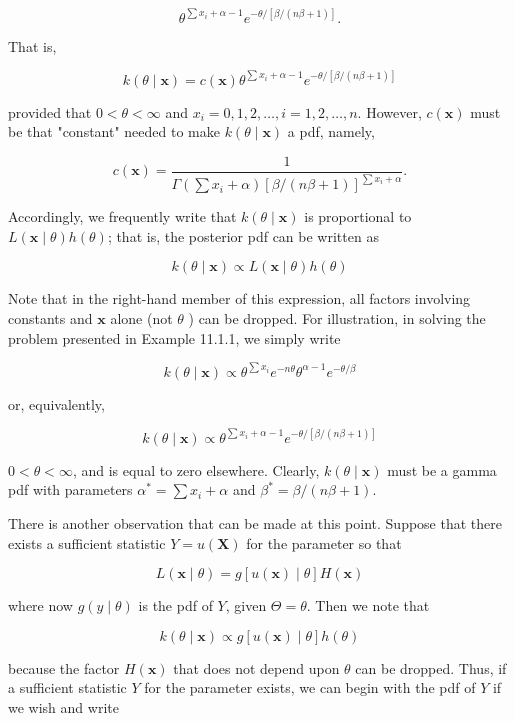 $$
\theta^{\sum x_{i}+\alpha-1} e^{-\theta /[\beta /(n \beta+1)]} .
$$

That is,

$$
k(\theta \mid \mathbf{x})=c(\mathbf{x}) \theta^{\sum x_{i}+\alpha-1} e^{-\theta /[\beta /(n \beta+1)]}
$$

provided that $0<\theta<\infty$ and $x_{i}=0,1,2, \ldots, i=1,2, \ldots, n$. However, $c(\mathbf{x})$ must be that "constant" needed to make $k(\theta \mid \mathbf{x})$ a pdf, namely,

$$
c(\mathbf{x})=\frac{1}{\Gamma\left(\sum x_{i}+\alpha\right)[\beta /(n \beta+1)]^{\sum x_{i}+\alpha}} .
$$

Accordingly, we frequently write that $k(\theta \mid \mathbf{x})$ is proportional to $L(\mathbf{x} \mid \theta) h(\theta)$; that is, the posterior pdf can be written as


\begin{equation*}
k(\theta \mid \mathbf{x}) \propto L(\mathbf{x} \mid \theta) h(\theta) \tag{11.1.8}
\end{equation*}


Note that in the right-hand member of this expression, all factors involving constants and $\mathbf{x}$ alone (not $\theta$ ) can be dropped. For illustration, in solving the problem presented in Example 11.1.1, we simply write

$$
k(\theta \mid \mathbf{x}) \propto \theta^{\sum x_{i}} e^{-n \theta} \theta^{\alpha-1} e^{-\theta / \beta}
$$

or, equivalently,

$$
k(\theta \mid \mathbf{x}) \propto \theta^{\sum x_{i}+\alpha-1} e^{-\theta /[\beta /(n \beta+1)]}
$$

$0<\theta<\infty$, and is equal to zero elsewhere. Clearly, $k(\theta \mid \mathbf{x})$ must be a gamma pdf with parameters $\alpha^{*}=\sum x_{i}+\alpha$ and $\beta^{*}=\beta /(n \beta+1)$.

There is another observation that can be made at this point. Suppose that there exists a sufficient statistic $Y=u(\mathbf{X})$ for the parameter so that

$$
L(\mathbf{x} \mid \theta)=g[u(\mathbf{x}) \mid \theta] H(\mathbf{x})
$$

where now $g(y \mid \theta)$ is the pdf of $Y$, given $\Theta=\theta$. Then we note that

$$
k(\theta \mid \mathbf{x}) \propto g[u(\mathbf{x}) \mid \theta] h(\theta)
$$

because the factor $H(\mathbf{x})$ that does not depend upon $\theta$ can be dropped. Thus, if a sufficient statistic $Y$ for the parameter exists, we can begin with the pdf of $Y$ if we wish and write



